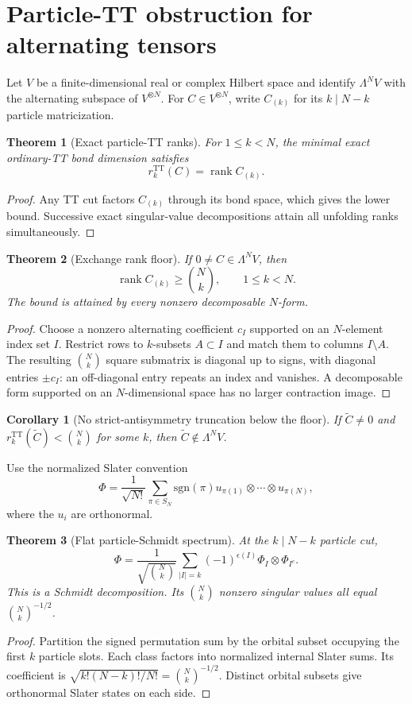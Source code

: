 \documentclass{article}
\newtheorem{theorem}{Theorem}
\newtheorem{corollary}{Corollary}
\newcommand{\TT}{\mathrm{TT}}
\newcommand{\rank}{\operatorname{rank}}
\begin{document}
\section{Particle-TT obstruction for alternating tensors}

Let $V$ be a finite-dimensional real or complex Hilbert space and identify
$\Lambda^N V$ with the alternating subspace of $V^{\otimes N}$. For
$C\in V^{\otimes N}$, write $C_{(k)}$ for its $k\mid N-k$ particle
matricization.

\begin{theorem}[Exact particle-TT ranks]
For $1\le k<N$, the minimal exact ordinary-TT bond dimension satisfies
\[
 r_k^{\TT}(C)=\rank C_{(k)}.
\]
\end{theorem}
\begin{proof}
Any TT cut factors $C_{(k)}$ through its bond space, which gives the lower
bound. Successive exact singular-value decompositions attain all unfolding
ranks simultaneously.
\end{proof}

\begin{theorem}[Exchange rank floor]
If $0\ne C\in\Lambda^N V$, then
\[
 \rank C_{(k)}\ge \binom{N}{k},\qquad 1\le k<N.
\]
The bound is attained by every nonzero decomposable $N$-form.
\end{theorem}
\begin{proof}
Choose a nonzero alternating coefficient $c_I$ supported on an $N$-element
index set $I$. Restrict rows to $k$-subsets $A\subset I$ and match them to
columns $I\setminus A$. The resulting $\binom{N}{k}$ square submatrix is
diagonal up to signs, with diagonal entries $\pm c_I$: an off-diagonal entry
repeats an index and vanishes. A decomposable form supported on an
$N$-dimensional space has no larger contraction image.
\end{proof}

\begin{corollary}[No strict-antisymmetry truncation below the floor]
If $\widetilde C\ne0$ and
$r_k^{\TT}(\widetilde C)<\binom{N}{k}$ for some $k$, then
$\widetilde C\notin\Lambda^N V$.
\end{corollary}

Use the normalized Slater convention
\[
 \Phi=\frac1{\sqrt{N!}}\sum_{\pi\in S_N}\mathrm{sgn}(\pi)
 u_{\pi(1)}\otimes\cdots\otimes u_{\pi(N)},
\]
where the $u_i$ are orthonormal.

\begin{theorem}[Flat particle-Schmidt spectrum]
At the $k\mid N-k$ particle cut,
\[
 \Phi=\frac1{\sqrt{\binom{N}{k}}}\sum_{|I|=k}
 (-1)^{\epsilon(I)}\Phi_I\otimes\Phi_{I^c}.
\]
This is a Schmidt decomposition. Its $\binom{N}{k}$ nonzero singular values
all equal $\binom{N}{k}^{-1/2}$.
\end{theorem}
\begin{proof}
Partition the signed permutation sum by the orbital subset occupying the first
$k$ particle slots. Each class factors into normalized internal Slater sums.
Its coefficient is
$\sqrt{k!(N-k)!/N!}=\binom{N}{k}^{-1/2}$. Distinct orbital subsets give
orthonormal Slater states on each side.
\end{proof}
\end{document}
